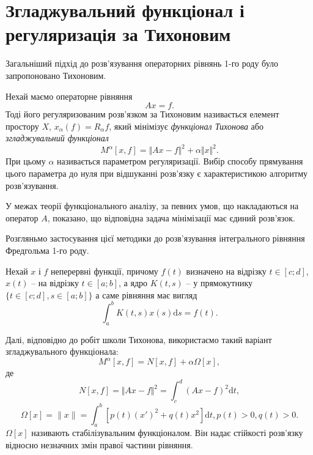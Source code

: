 \documentclass[14pt,twoside]{extreport}
\theoremstyle{mystyle}
\numberwithin{equation}{chapter}
\begin{document}
\chapter{Згладжувальний функціонал і регуляризація за Тихоновим}\label{tychregsec}

Загальніший підхід до розв'язування операторних рівнянь 1-го роду було запропоновано Тихоновим.

Нехай маємо операторне рівняння
\begin{equation}\label{tychopeq}
Ax=f.
\end{equation}
Тоді його регуляризованим розв'язком за Тихоновим називається елемент простору $X$, $x_\alpha(f) = R_{\alpha}f$, який мінімізує \emph{функціонал Тихонова} або \emph{згладжувальний функціонал}
$$
M^{\alpha}[x, f] = \Vert Ax-f\Vert^{2}+\alpha\Vert x\Vert^{2}.
$$
При цьому $\alpha$ називається параметром регуляризації. Вибір способу прямування цього параметра до нуля при відшуканні розв'язку є характеристикою алгоритму розв'язування.

У межах теорії функціонального аналізу, за певних умов, що накладаються на оператор $A$, показано, що відповідна задача мінімізації має єдиний розв'язок.

Розгляньмо застосування цієї методики до розв'язування інтегрального рівняння Фредгольма 1-го роду.

Нехай $x$ і $f$ неперервні функції, причому $f(t)$ визначено на відрізку $t \in [c; d]$, $x(t)$ -- на відрізку $t \in [a; b]$, а ядро $K(t, s)$ -- у прямокутнику $\{t \in [c; d], s \in [a; b]\}$ а саме рівняння має вигляд
\begin{equation}\label{tychfredeq1}
\int_{a}^{b} K(t, s) x(s) \mathrm{d}s = f(t).
\end{equation}

Далі, відповідно до робіт школи Тихонова, використаємо такий варіант згладжувального функціонала:
\begin{equation}
	M^{\alpha}[x, f]=N[x, f] + \alpha\Omega[x],
\end{equation}
де
\begin{equation}
	N[x,\displaystyle  f]=\Vert Ax-f\Vert^{2} =\int_{c}^{d}(Ax-f)^{2}\mathrm{d}t,
\end{equation}
\begin{equation}
\displaystyle \Omega[x] = \|x\| = \int_{a}^{b}[p(t)(x')^{2}+q(t)x^{2}]\mathrm{d}t, p(t)>0, q(t)>0.
\end{equation}
$\Omega[x]$ називають стабілізувальним функціоналом. Він надає стійкості розв'язку відносно незначних змін правої частини рівняння.
\end{document}

